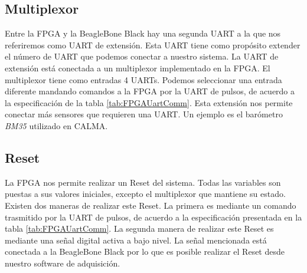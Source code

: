 	\subsection{Multiplexor}
		Entre la FPGA y la BeagleBone Black hay una segunda UART a la que nos referiremos como UART de extensión. Esta UART tiene como
		propósito extender el número de UART que podemos conectar a nuestro sistema. La UART de extensión está conectada a un multiplexor
		implementado en la FPGA. El multiplexor tiene como entradas 4 UARTs. Podemos seleccionar una entrada diferente mandando comandos a la
		FPGA por la UART de pulsos, de acuerdo a la especificación de la tabla \ref{tab:FPGAUartComm}. Esta extensión nos permite conectar más
		sensores que requieren una UART. Un ejemplo es el barómetro \emph{BM35} utilizado en CALMA.
	\subsection{Reset}
		La FPGA nos permite realizar un Reset del sistema. Todas las variables son puestas a sus valores iniciales, excepto el multiplexor que
		mantiene su estado. Existen dos maneras de realizar este Reset. La primera es mediante un comando trasmitido por la UART de pulsos, de
		acuerdo a la especificación presentada en la tabla \ref{tab:FPGAUartComm}. La segunda manera de realizar este Reset es mediante una
		señal digital activa a bajo nivel. La señal mencionada está conectada a la BeagleBone Black por lo que es posible realizar el Reset
		desde nuestro software de adquisición. 
